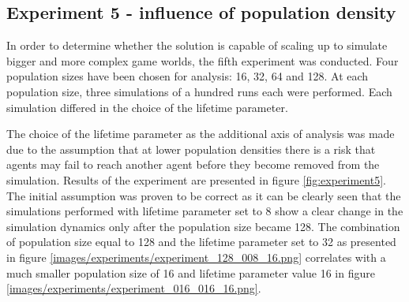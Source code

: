 \subsection{Experiment 5 - influence of population density}

In order to determine whether the solution is capable of scaling up to simulate bigger and more complex game worlds, the fifth experiment was conducted.
Four population sizes have been chosen for analysis: 16, 32, 64 and 128.
At each population size, three simulations of a hundred runs each were performed.
Each simulation differed in the choice of the lifetime parameter.

The choice of the lifetime parameter as the additional axis of analysis was made due to the assumption that at lower population densities there is a risk that agents may fail to reach another agent before they become removed from the simulation.
Results of the experiment are presented in figure \ref{fig:experiment5}.
The initial assumption was proven to be correct as it can be clearly seen that the simulations performed with lifetime parameter set to 8 show a clear change in the simulation dynamics only after the population size became 128.
The combination of population size equal to 128 and the lifetime parameter set to 32 as presented in figure \ref{images/experiments/experiment_128_008_16.png} correlates with a much smaller population size of 16 and lifetime parameter value 16 in figure \ref{images/experiments/experiment_016_016_16.png}.

